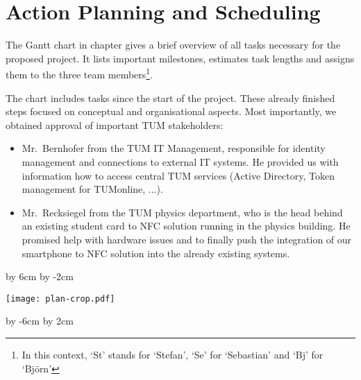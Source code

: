 \section{Action Planning and Scheduling}\label{sec:plan}





The Gantt chart in chapter gives a brief overview of all tasks necessary for the proposed project.
It lists important milestones, estimates task lengths and assigns them to the three team members\footnote{In this context, `St' stands for `Stefan', `Se' for `Sebastian' and `Bj' for `Björn'}.

The chart includes tasks since the start of the project.
These already finished steps focused on conceptual and organisational aspects.
Most importantly, we obtained approval of important TUM stakeholders:
\begin{itemize}
\item Mr.~Bernhofer from the TUM IT Management, responsible for identity management and connections to external IT systems. He provided us with information how to access central TUM services (Active Directory, Token management for TUMonline, ...).
\item Mr.~Recksiegel from the TUM physics department, who is the head behind an existing student card to NFC solution running in the physics building. He promised help with hardware issues and to finally push the integration of our smartphone to NFC solution into the already existing systems.
\end{itemize}










\par\vfill\break %

\advance\vsize by 6cm %
\advance\voffset by -2cm %
\centerline{\texttt{[image: plan-crop.pdf]}}
\par\vfill\break %

\advance\vsize by -6cm %
\advance\voffset by 2cm %